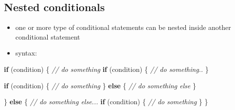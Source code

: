\documentclass[11pt]{article}
\providecommand{\tightlist}{%
      \setlength{\itemsep}{0pt}\setlength{\parskip}{0pt}}
\newenvironment{Shaded}{}{}
\newcommand{\CommentTok}[1]{\textcolor[rgb]{0.38,0.63,0.69}{\textit{{#1}}}}
\newcommand{\NormalTok}[1]{{#1}}
\newcommand{\ControlFlowTok}[1]{\textcolor[rgb]{0.00,0.44,0.13}{\textbf{{#1}}}}
\newcommand{\OperatorTok}[1]{\textcolor[rgb]{0.40,0.40,0.40}{{#1}}}
\begin{document}
    \hypertarget{nested-conditionals}{%
\subsection{Nested conditionals}\label{nested-conditionals}}

\begin{itemize}
\tightlist
\item
  one or more type of conditional statements can be nested inside
  another conditional statement
\item
  syntax:
\end{itemize}

\begin{Shaded}
\begin{Highlighting}[]
    \ControlFlowTok{if} \OperatorTok{(}\NormalTok{condition}\OperatorTok{)} \OperatorTok{\{}
        \CommentTok{// do something}
        \ControlFlowTok{if} \OperatorTok{(}\NormalTok{condition}\OperatorTok{)} \OperatorTok{\{}
            \CommentTok{// do something..}
        \OperatorTok{\}}

        \ControlFlowTok{if} \OperatorTok{(}\NormalTok{condition}\OperatorTok{)} \OperatorTok{\{}
            \CommentTok{// do something}
        \OperatorTok{\}}
        \ControlFlowTok{else} \OperatorTok{\{}
            \CommentTok{// do something else}
        \OperatorTok{\}}

    \OperatorTok{\}}
    \ControlFlowTok{else} \OperatorTok{\{}
        \CommentTok{// do something else...}
        \ControlFlowTok{if} \OperatorTok{(}\NormalTok{condition}\OperatorTok{)} \OperatorTok{\{}
            \CommentTok{// do something}
        \OperatorTok{\}}
    \OperatorTok{\}}
\end{Highlighting}
\end{Shaded}
\end{document}
